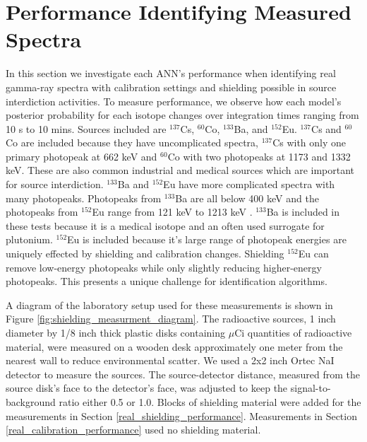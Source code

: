 \section{Performance Identifying Measured Spectra}

In this section we investigate each ANN's performance when identifying real gamma-ray spectra with calibration settings and shielding possible in source interdiction activities. To measure performance, we observe how each model's posterior probability for each isotope changes over integration times ranging from 10 s to 10 mins. Sources included are $^{137}$Cs, $^{60}$Co, $^{133}$Ba, and $^{152}$Eu. $^{137}$Cs and $^{60}$Co are included because they have uncomplicated spectra, $^{137}$Cs with only one primary photopeak at 662 keV and $^{60}$Co with two photopeaks at 1173 and 1332 keV. These are also common industrial and medical sources which are important for source interdiction. $^{133}$Ba and $^{152}$Eu have more complicated spectra with many photopeaks. Photopeaks from $^{133}$Ba are all below 400 keV and the photopeaks from $^{152}$Eu range from 121 keV to 1213 keV \cite{bigbluebook}. $^{133}$Ba is included in these tests because it is a medical isotope and an often used surrogate for plutonium. $^{152}$Eu is included because it's large range of photopeak energies are uniquely effected by shielding and calibration changes. Shielding $^{152}$Eu can remove low-energy photopeaks while only slightly reducing higher-energy photopeaks. This presents a unique challenge for identification algorithms.

A diagram of the laboratory setup used for these measurements is shown in Figure \ref{fig:shielding_measurment_diagram}. The radioactive sources, 1 inch diameter by 1/8 inch thick plastic disks containing $\mu$Ci quantities of radioactive material, were measured on a wooden desk approximately one meter from the nearest wall to reduce environmental scatter. We used a 2x2 inch Ortec NaI detector to measure the sources. The source-detector distance, measured from the source disk's face to the detector's face, was adjusted to keep the signal-to-background ratio either 0.5 or 1.0. Blocks of shielding material were added for the measurements in Section \ref{real_shielding_performance}. Measurements in Section \ref{real_calibration_performance} used no shielding material. 

